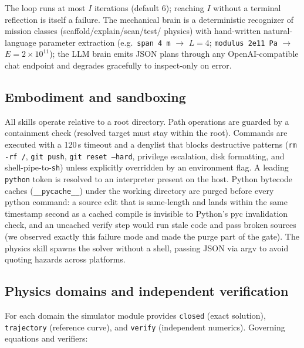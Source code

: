 \documentclass[11pt,a4paper]{article}
\begin{document}
The loop runs at most $I$ iterations (default 6); reaching $I$ without a
terminal reflection is itself a failure. The mechanical brain is a
deterministic recognizer of mission classes (scaffold/explain/scan/test/
physics) with hand-written natural-language parameter extraction (e.g.\
\texttt{span 4 m} $\to$ $L=4$; \texttt{modulus 2e11 Pa} $\to$ $E=2\times10^{11}$);
the LLM brain emits JSON plans through any OpenAI-compatible chat endpoint
and degrades gracefully to inspect-only on error.

\subsection*{Embodiment and sandboxing}

All skills operate relative to a root directory. Path operations are guarded
by a containment check (resolved target must stay within the root).
Commands are executed with a 120\,s timeout and a denylist that blocks
destructive patterns (\texttt{rm -rf /}, \texttt{git push},
\texttt{git reset --hard}, privilege escalation, disk formatting, and
shell-pipe-to-\texttt{sh}) unless explicitly overridden by an environment
flag. A leading \texttt{python} token is resolved to an interpreter present
on the host. Python bytecode caches (\texttt{\_\_pycache\_\_}) under the
working directory are purged before every python command: a source edit that
is same-length and lands within the same timestamp second as a cached
compile is invisible to Python's pyc invalidation check, and an uncached
verify step would run stale code and pass broken sources (we observed
exactly this failure mode and made the purge part of the gate). The physics skill spawns the solver without a shell, passing
JSON via argv to avoid quoting hazards across platforms.

\subsection*{Physics domains and independent verification}

For each domain the simulator module provides \texttt{closed} (exact
solution), \texttt{trajectory} (reference curve), and \texttt{verify}
(independent numerics). Governing equations and verifiers:
\end{document}
